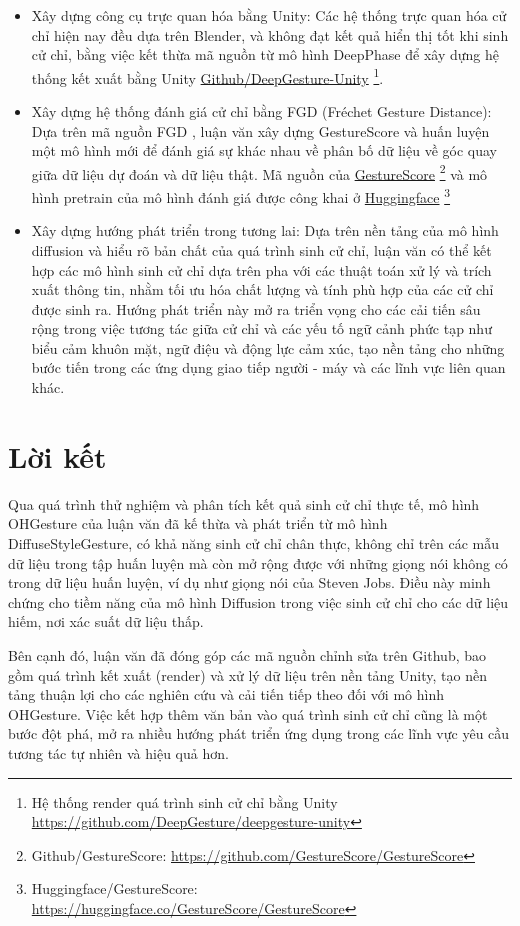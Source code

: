 \begin{itemize}
	\item Xây dựng công cụ trực quan hóa bằng Unity: Các hệ thống trực quan hóa cử chỉ hiện nay đều dựa trên Blender, và không đạt kết quả hiển thị tốt khi sinh cử chỉ, bằng việc kết thừa mã nguồn từ mô hình DeepPhase \cite{starke2022deepphase} để xây dựng hệ thống kết xuất bằng Unity \hyperlink{https://github.com/DeepGesture/deepgesture-unity}{Github/DeepGesture-Unity}
	\footnote{Hệ thống render quá trình sinh cử chỉ bằng Unity \url{https://github.com/DeepGesture/deepgesture-unity}}.
	
	\item Xây dựng hệ thống đánh giá cử chỉ bằng FGD (Fréchet Gesture Distance): Dựa trên mã nguồn FGD \cite{yoon2020speech}, luận văn xây dựng GestureScore và huấn luyện một mô hình mới để đánh giá sự khác nhau về phân bố dữ liệu về góc quay giữa dữ liệu dự đoán và dữ liệu thật. Mã nguồn của  \hyperlink{https://github.com/GestureScore/GestureScore}{GestureScore} \footnote{Github/GestureScore: \url{https://github.com/GestureScore/GestureScore}} và mô hình pretrain của mô hình đánh giá được công khai ở  \hyperlink{https://huggingface.co/GestureScore}{Huggingface} \footnote{Huggingface/GestureScore: \url{https://huggingface.co/GestureScore/GestureScore}}
	\item Xây dựng hướng phát triển trong tương lai: Dựa trên nền tảng của mô hình diffusion và hiểu rõ bản chất của quá trình sinh cử chỉ, luận văn có thể kết hợp các mô hình sinh cử chỉ dựa trên pha với các thuật toán xử lý và trích xuất thông tin, nhằm tối ưu hóa chất lượng và tính phù hợp của các cử chỉ được sinh ra. Hướng phát triển này mở ra triển vọng cho các cải tiến sâu rộng trong việc tương tác giữa cử chỉ và các yếu tố ngữ cảnh phức tạp như biểu cảm khuôn mặt, ngữ điệu và động lực cảm xúc, tạo nền tảng cho những bước tiến trong các ứng dụng giao tiếp người - máy và các lĩnh vực liên quan khác.
\end{itemize}

\newpage

\section{Lời kết}

Qua quá trình thử nghiệm và phân tích kết quả sinh cử chỉ thực tế, mô hình OHGesture của luận văn đã kế thừa và phát triển từ mô hình DiffuseStyleGesture, có khả năng sinh cử chỉ chân thực, không chỉ trên các mẫu dữ liệu trong tập huấn luyện mà còn mở rộng được với những giọng nói không có trong dữ liệu huấn luyện, ví dụ như giọng nói của Steven Jobs. Điều này minh chứng cho tiềm năng của mô hình Diffusion trong việc sinh cử chỉ cho các dữ liệu hiếm, nơi xác suất dữ liệu thấp.

Bên cạnh đó, luận văn đã đóng góp các mã nguồn chỉnh sửa trên Github, bao gồm quá trình kết xuất (render) và xử lý dữ liệu trên nền tảng Unity, tạo nền tảng thuận lợi cho các nghiên cứu và cải tiến tiếp theo đối với mô hình OHGesture. Việc kết hợp thêm văn bản vào quá trình sinh cử chỉ cũng là một bước đột phá, mở ra nhiều hướng phát triển ứng dụng trong các lĩnh vực yêu cầu tương tác tự nhiên và hiệu quả hơn.
